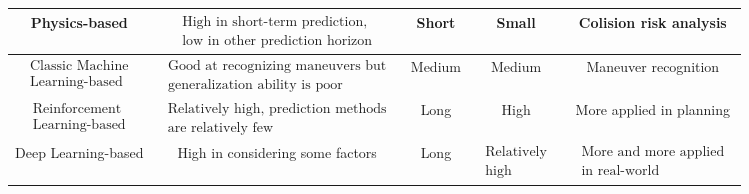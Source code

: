 \begin{table}[h]
\begin{adjustbox}{max width=\textwidth}
\begin{tabular}{c | c c c c }
			Physics-based & $\begin{array}{l}\text { High in short-term prediction,  } \\
				\text { low in other prediction horizon }\end{array}$ & Short & Small & Colision risk analysis \\
			\midrule
			$\begin{array}{l}\text { Classic Machine } \\
				\text { Learning-based }\end{array}$ & $\begin{array}{l}\text { Good at recognizing maneuvers but } \\
				\text { generalization ability is poor }\end{array}$ & Medium & Medium & Maneuver recognition \\
			\midrule
			$\begin{array}{l}\text { Reinforcement } \\
				\text { Learning-based }\end{array}$ & $\begin{array}{l}\text { Relatively high, prediction methods  } \\
				\text { are relatively few }\end{array}$ & Long & High & More applied in planning \\
			\midrule
			Deep Learning-based & High in considering some factors & Long & $\begin{array}{l}\text { Relatively } \\
				\text { high }\end{array}$ & $\begin{array}{l}\text { More and more applied } \\
				\text { in real-world }\end{array}$ \\ 
			\bottomrule
		\end{tabular}
		\label{table:2_summary_mp_methods}
	\end{adjustbox}
\end{table}

